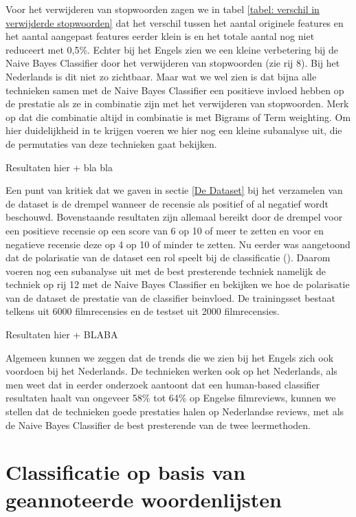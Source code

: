 Voor het verwijderen van stopwoorden zagen we in tabel \ref{tabel: verschil in verwijderde stopwoorden} dat het verschil tussen het aantal originele features en het aantal aangepast features eerder klein is en het totale aantal nog niet reduceert met 0,5\%. Echter bij het Engels zien we een kleine verbetering bij de Naive Bayes Classifier door het verwijderen van stopwoorden (zie rij 8). Bij het Nederlands is dit niet zo zichtbaar. Maar wat we wel zien is dat bijna alle technieken samen met de Naive Bayes Classifier een positieve invloed hebben op de prestatie als ze in combinatie zijn met het verwijderen van stopwoorden. Merk op dat die combinatie altijd in combinatie is met Bigrams of  Term weighting. Om hier duidelijkheid in te krijgen voeren we hier nog een kleine subanalyse uit, die de permutaties van deze technieken gaat bekijken.

Resultaten hier + bla bla


Een punt van kritiek dat we gaven in sectie \ref{De Dataset} bij het verzamelen van de dataset is de drempel wanneer de recensie als positief of al negatief wordt beschouwd. Bovenstaande resultaten zijn allemaal bereikt door de drempel voor een positieve recensie op een score van 6 op 10 of meer te zetten en voor en negatieve recensie deze op 4 op 10 of minder te zetten.
Nu eerder was aangetoond dat de polarisatie van de dataset een rol speelt bij de classificatie (\cite{maas-EtAl:2011:ACL-HLT2011}). Daarom voeren nog een subanalyse uit met de best presterende techniek namelijk de techniek op rij 12 met de Naive Bayes Classifier en bekijken we hoe de polarisatie van de dataset de prestatie van de classifier beinvloed. De trainingsset bestaat telkens uit 6000 filmrecensies en de testset uit 2000 filmrecensies.


Resultaten hier + BLABA 


Algemeen kunnen we zeggen dat de trends die we zien bij het Engels zich ook voordoen bij het Nederlands. De technieken werken ook op het Nederlands, als men weet dat in eerder onderzoek \cite{pang2002thumbs} aantoont dat een human-based classifier resultaten haalt van ongeveer 58\% tot 64\% op Engelse filmreviews, kunnen we stellen dat de technieken goede prestaties halen op Nederlandse reviews, met als de Naive Bayes Classifier de best presterende van de twee leermethoden.


\section{Classificatie op basis van geannoteerde woordenlijsten}\label{Classificatie op basis van geannoteerde woordenlijsten}

